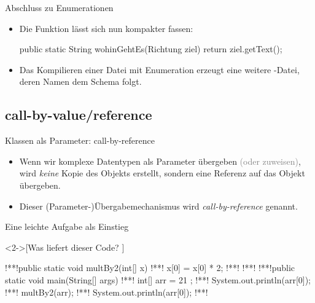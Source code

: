 \begin{frame}[fragile]{Abschluss zu Enumerationen}
    \begin{itemize}[<+(1)->]
        \widei
        \item Die Funktion  lässt sich nun kompakter fassen:\pause{}
\begin{plainjava}
public static String wohinGehtEs(Richtung ziel){
    return ziel.getText();
}
\end{plainjava}
        \item Das Kompilieren einer Datei mit Enumeration erzeugt eine weitere -Datei,\pause{} deren Namen dem Schema  folgt.
    \end{itemize}
\end{frame}


\subsection{call-by-value/reference}
\begin{frame}[fragile]{Klassen als Parameter: call-by-reference}
    \begin{itemize}[<+(1)->]
        \widei
        \item \hypertarget<1>{mrk:call-by-ref}{Wenn} wir komplexe Datentypen als Parameter übergeben \textcolor{gray}{(oder zuweisen)},\pause{} wird \emph{keine} Kopie des Objekts erstellt,\pause{} sondern eine Referenz auf das Objekt übergeben.
        \item Dieser (Parameter-)Übergabemechanismus wird \emph{call-by-reference} genannt.
    \end{itemize}
\end{frame}

\ifull
\begin{frame}[fragile,c]{Eine leichte Aufgabe als Einstieg}
    \begin{exercise}<2->[Was liefert dieser Code? ]
        \begin{plainjava}
!**!public static void multBy2(int[] x){
!**!    x[0] = x[0] * 2;
!**!}
!**!
!**!public static void main(String[] args) {
!**!    int[] arr = { 21 };
!**!    System.out.println(arr[0]);
!**!    multBy2(arr);
!**!    System.out.println(arr[0]);
!**!}
        \end{plainjava}
    \end{exercise}
\end{frame}


